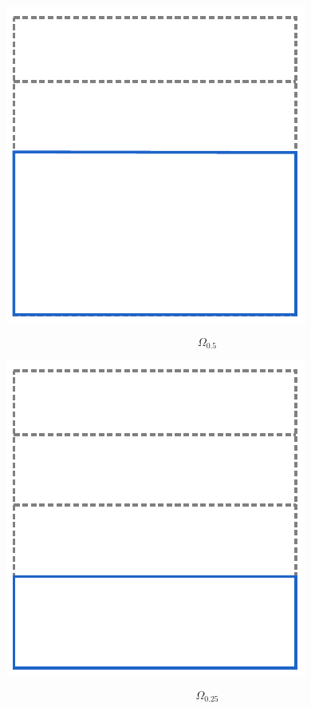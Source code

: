 \documentclass[crop, fleqn]{standalone}
\begin{document}
\begin{minipage}{60pt}
    \includegraphics[width=\linewidth]{main-theorem/rho-3.pdf}

    \vspace*{-30pt}

    \[ \Omega_{0.5} \]

    \vspace*{2pt}
\end{minipage}
\hspace{3pt}
\begin{minipage}{60pt}
    \includegraphics[width=\linewidth]{main-theorem/rho-4.pdf}

    \vspace*{-30pt}

    \[ \Omega_{0.25} \]

    \vspace*{2pt}
\end{minipage}
\end{document}
